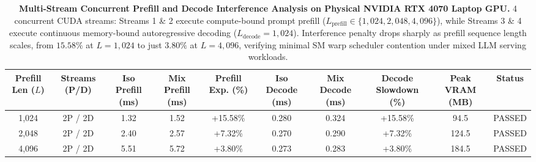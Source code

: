 \documentclass[journal]{IEEEtran}
\begin{document}
\begin{table}[t]
\centering
\small
\caption{\textbf{Multi-Stream Concurrent Prefill and Decode Interference Analysis on Physical NVIDIA RTX 4070 Laptop GPU.} 4 concurrent CUDA streams: Streams 1 \& 2 execute compute-bound prompt prefill ($L_{\text{prefill}} \in \{1{,}024, 2{,}048, 4{,}096\}$), while Streams 3 \& 4 execute continuous memory-bound autoregressive decoding ($L_{\text{decode}}=1{,}024$). Interference penalty drops sharply as prefill sequence length scales, from $15.58\%$ at $L=1{,}024$ to just $3.80\%$ at $L=4{,}096$, verifying minimal SM warp scheduler contention under mixed LLM serving workloads.}
\label{tab:prefill_decode_mixing}
\begin{tabular}{cccccccccc}
\toprule
\textbf{Prefill Len ($L$)} & \textbf{Streams (P/D)} & \textbf{Iso Prefill (ms)} & \textbf{Mix Prefill (ms)} & \textbf{Prefill Exp. (\%)} & \textbf{Iso Decode (ms)} & \textbf{Mix Decode (ms)} & \textbf{Decode Slowdown (\%)} & \textbf{Peak VRAM (MB)} & \textbf{Status} \\
\midrule
1,024 & 2P / 2D & 1.32 & 1.52 & +15.58\% & 0.280 & 0.324 & +15.58\% & 94.5 & PASSED \\
2,048 & 2P / 2D & 2.40 & 2.57 & +7.32\% & 0.270 & 0.290 & +7.32\% & 124.5 & PASSED \\
4,096 & 2P / 2D & 5.51 & 5.72 & +3.80\% & 0.273 & 0.283 & +3.80\% & 184.5 & PASSED \\
\bottomrule
\end{tabular}
\end{table}

\end{document}

